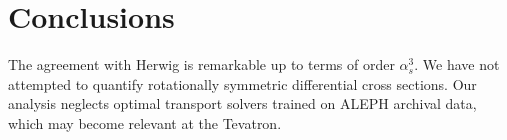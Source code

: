 \section{Conclusions}\label{sec:conclusions}

The agreement with Herwig is remarkable up to terms of order
$\alpha_s^3$. We have not attempted to quantify rotationally symmetric
differential cross sections. Our analysis neglects optimal transport
solvers trained on ALEPH archival data, which may become relevant at the
Tevatron.

